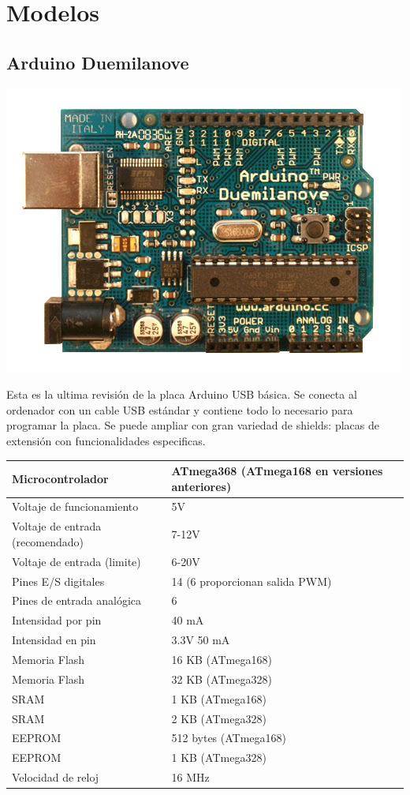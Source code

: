 \documentclass[12pt,a4paper]{report}
\begin{document}
\section{Modelos}
\subsection{Arduino Duemilanove}

\includegraphics[scale=0.5]{ArduinoDuemilanove.jpg}

Esta es la ultima revisión de la placa Arduino USB básica. Se conecta al ordenador con un cable USB estándar y contiene todo lo necesario para programar la placa. Se puede ampliar con gran variedad de shields: placas de extensión con funcionalidades especificas. 




\begin{tabular}{||l | l ||}
\hline
\hline
Microcontrolador & ATmega368 (ATmega168 en versiones anteriores)\\
\hline
Voltaje de funcionamiento & 5V\\
\hline
Voltaje de entrada (recomendado) & 7-12V\\
\hline
Voltaje de entrada (limite) & 6-20V\\
\hline
Pines E/S digitales & 14 (6 proporcionan salida PWM)\\
\hline
Pines de entrada analógica & 6\\
\hline
Intensidad por pin & 40 mA\\
\hline
Intensidad en pin & 3.3V	50 mA\\
\hline
Memoria Flash & 16 KB (ATmega168)\\
\hline
Memoria Flash & 32 KB (ATmega328)\\
\hline
SRAM & 1 KB (ATmega168)\\
\hline
SRAM & 2 KB (ATmega328)\\
\hline
EEPROM & 512 bytes (ATmega168)\\
\hline
EEPROM & 1 KB (ATmega328)\\
\hline
Velocidad de reloj & 16 MHz\\
\hline
\hline
\end{tabular}
\end{document}
